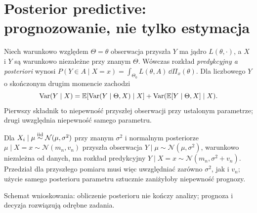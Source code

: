 \section{Posterior predictive: prognozowanie, nie tylko estymacja}
\begin{definicja}
Niech warunkowo względem $\Theta=\theta$ obserwacja przyszła
$Y$ ma jądro $L(\theta,\cdot)$, a $X$ i $Y$ są warunkowo
niezależne przy znanym $\Theta$. Wówczas rozkład
\emph{predykcyjny a posteriori} wynosi
$P(Y\in A\mid X=x)=\int_{\Theta_0}L(\theta,A)\,\dd\Pi_x(\theta)$.
Dla liczbowego $Y$ o skończonym drugim momencie zachodzi
\[
 \operatorname{Var}(Y\mid X)=\mathbb E[\operatorname{Var}(Y\mid\Theta,X)\mid X]
 +\operatorname{Var}(\mathbb E[Y\mid\Theta,X]\mid X).
\]
Pierwszy składnik to niepewność przyszłej obserwacji przy ustalonym
parametrze; drugi uwzględnia niepewność samego parametru.
\end{definicja}

\begin{przyklad}
Dla $X_i\mid\mu\mathrel{\overset{\mathrm{iid}}\sim}\mathcal N(\mu,\sigma^2)$ przy znanym
$\sigma^2$ i normalnym posteriorze $\mu\mid X=x\sim
\mathcal N(m_n,v_n)$ przyszła obserwacja $Y\mid\mu\sim
\mathcal N(\mu,\sigma^2)$, warunkowo niezależna od danych,
ma rozkład predykcyjny $Y\mid X=x\sim\mathcal N(m_n,\sigma^2+v_n)$.
Przedział dla przyszłego pomiaru musi więc uwzględniać zarówno
$\sigma^2$, jak i $v_n$; użycie samego posterioru parametru
sztucznie zaniżyłoby niepewność prognozy.
\end{przyklad}

\begin{center}
\begin{minipage}{\textwidth}
\centering
{}

{\small Schemat wnioskowania: obliczenie posterioru nie kończy analizy;
prognoza i decyzja rozwiązują odrębne zadania.}
\end{minipage}
\end{center}

